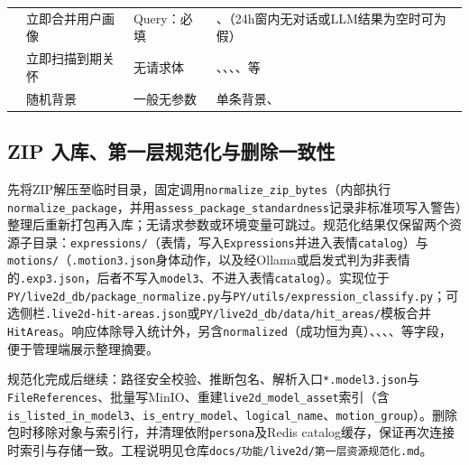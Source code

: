 \documentclass{base}
\begin{document}
\begin{table}[htbp]
\begin{tabularx}{\textwidth}{@{} >{\raggedright\arraybackslash}p{3.35cm} >{\raggedright\arraybackslash}p{2.25cm} Y Y @{}}
           & 立即合并用户画像    & Query：必填                                                                        & 、（24h窗内无对话或LLM结果为空时可为假）                                         \\
                & 立即扫描到期关怀    & 无请求体                                                                                         & 、、、、等 \\
                 & 随机背景        & 一般无参数                                                                                        & 单条背景、                                                                           \\
        \bottomrule
    \end{tabularx}
    \endgroup
\end{table}

\subsection{ZIP 入库、第一层规范化与删除一致性}

先将ZIP解压至临时目录，固定调用\texttt{normalize\_zip\_bytes}（内部执行\texttt{normalize\_package}，并用\texttt{assess\_package\_standardness}记录非标准项写入警告）整理后重新打包再入库；无请求参数或环境变量可跳过。规范化结果仅保留两个资源子目录：\texttt{expressions/}（表情，写入\texttt{Expressions}并进入表情\texttt{catalog}）与\texttt{motions/}（\texttt{.motion3.json}身体动作，以及经Ollama或启发式判为非表情的\texttt{.exp3.json}，后者不写入\texttt{model3}、不进入表情\texttt{catalog}）。实现位于\texttt{PY/live2d\_db/package\_normalize.py}与\texttt{PY/utils/expression\_classify.py}；可选侧栏\texttt{.live2d-hit-areas.json}或\texttt{PY/live2d\_db/data/hit\_areas/}模板合并\texttt{HitAreas}。响应体除导入统计外，另含\texttt{normalized}（成功恒为真）、、、、等字段，便于管理端展示整理摘要。

规范化完成后继续：路径安全校验、推断包名、解析入口\texttt{*.model3.json}与\texttt{FileReferences}、批量写MinIO、重建\texttt{live2d\_model\_asset}索引（含\texttt{is\_listed\_in\_model3}、\texttt{is\_entry\_model}、\texttt{logical\_name}、\texttt{motion\_group}）。删除包时移除对象与索引行，并清理依附\texttt{persona}及Redis catalog缓存，保证再次连接时索引与存储一致。工程说明见仓库\texttt{docs/功能/live2d/第一层资源规范化.md}。
\end{document}
